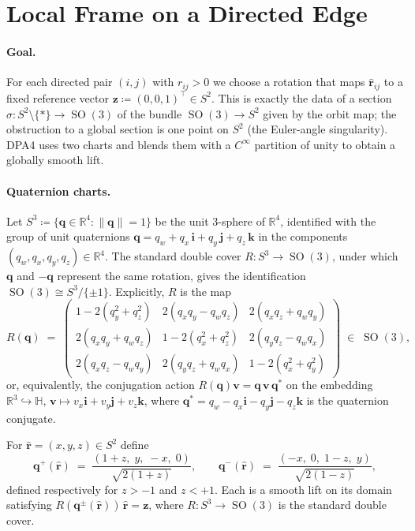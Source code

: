 \documentclass[11pt,a4paper]{article}
\DeclareMathOperator{\SO}{SO}
\newcommand{\R}{\mathbb{R}}
\newcommand{\Sph}{S^2}
\newcommand{\brh}{\hat{\bm{r}}}
\newcommand{\bz}{\bm{z}}
\newcommand{\bq}{\bm{q}}
\theoremstyle{plain}
\theoremstyle{definition}
\theoremstyle{remark}
\begin{document}
\section{Local Frame on a Directed Edge}\label{sec:frame}

\paragraph{Goal.}
For each directed pair $(i,j)$ with $r_{ij}>0$ we choose a rotation that maps
$\brh_{ij}$ to a fixed reference vector $\bz\coloneqq(0,0,1)^\top\in\Sph$. This
is exactly the data of a section $\sigma:\Sph\setminus\{*\}\to\SO(3)$ of the
bundle $\SO(3)\to\Sph$ given by the orbit map; the obstruction to a global
section is one point on $\Sph$ (the Euler-angle singularity). DPA4 uses two
charts and blends them with a $C^\infty$ partition of unity to obtain a
globally smooth lift.

\paragraph{Quaternion charts.}
Let $S^3\coloneqq\{\bq\in\R^4:\|\bq\|=1\}$ be the unit $3$-sphere of $\R^4$,
identified with the group of unit quaternions
$\bq=q_w+q_x\,\mathbf{i}+q_y\,\mathbf{j}+q_z\,\mathbf{k}$ in the components
$(q_w,q_x,q_y,q_z)\in\R^4$. The standard double cover $R:S^3\to\SO(3)$, under
which $\bq$ and $-\bq$ represent the same rotation, gives the identification
$\SO(3)\cong S^3/\{\pm 1\}$. Explicitly, $R$ is the map
\begin{equation}\label{eq:R-quat}
    R(\bq) \;=\;
    \begin{pmatrix}
        1-2(q_y^2+q_z^2) & 2(q_xq_y-q_wq_z) & 2(q_xq_z+q_wq_y) \\
        2(q_xq_y+q_wq_z) & 1-2(q_x^2+q_z^2) & 2(q_yq_z-q_wq_x) \\
        2(q_xq_z-q_wq_y) & 2(q_yq_z+q_wq_x) & 1-2(q_x^2+q_y^2)
    \end{pmatrix}\;\in\;\SO(3),
\end{equation}
or, equivalently, the conjugation action $R(\bq)\bm{v}=\bq\,\bm{v}\,\bq^{*}$ on the embedding $\R^3\hookrightarrow\mathbb{H}$, $\bm{v}\mapsto v_x\mathbf{i}+v_y\mathbf{j}+v_z\mathbf{k}$, where $\bq^{*}=q_w-q_x\mathbf{i}-q_y\mathbf{j}-q_z\mathbf{k}$ is the quaternion conjugate.

For $\brh=(x,y,z)\in\Sph$ define
\begin{equation}\label{eq:charts}
    \bq^{+}(\brh)\;=\;\frac{(1+z,\;y,\;-x,\;0)}{\sqrt{2(1+z)}},
    \qquad
    \bq^{-}(\brh)\;=\;\frac{(-x,\;0,\;1-z,\;y)}{\sqrt{2(1-z)}},
\end{equation}
defined respectively for $z>-1$ and $z<+1$.
Each is a smooth lift on its domain satisfying $R(\bq^{\pm}(\brh))\,\brh=\bz$, where $R:S^3\to\SO(3)$ is the standard double cover.
\end{document}
